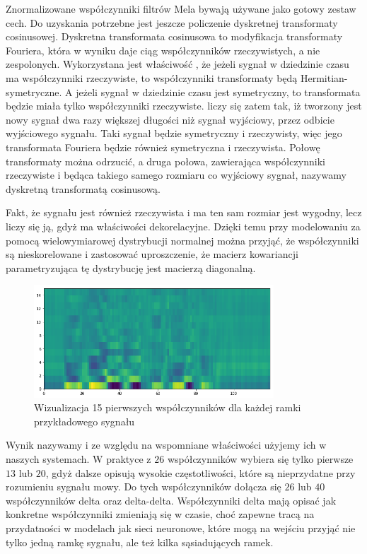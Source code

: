Znormalizowane współczynniki filtrów Mela bywają używane jako gotowy zestaw cech. Do uzyskania 
potrzebne jest jeszcze policzenie dyskretnej transformaty cosinusowej. Dyskretna transformata cosinusowa to modyfikacja
transformaty Fouriera, która w wyniku daje ciąg współczynników rzeczywistych, a nie zespolonych. Wykorzystana jest
właściwość , że jeżeli sygnał w dziedzinie czasu ma współczynniki rzeczywiste, to współczynniki transformaty
będą Hermitian-symetryczne. A jeżeli sygnał w dziedzinie czasu jest symetryczny, to transformata będzie miała
tylko współczynniki rzeczywiste.  liczy się zatem tak, iż tworzony jest nowy sygnał dwa razy większej długości niż
sygnał wyjściowy, przez odbicie wyjściowego sygnału. Taki sygnał będzie symetryczny i rzeczywisty, więc jego transformata
Fouriera będzie również symetryczna i rzeczywista. Połowę transformaty można odrzucić, a druga połowa, zawierająca
współczynniki rzeczywiste i będąca takiego samego rozmiaru co wyjściowy sygnał, nazywamy dyskretną transformatą cosinusową.

Fakt, że  sygnału jest również rzeczywista i ma ten sam rozmiar jest wygodny, lecz liczy się ją,
gdyż ma właściwości dekorelacyjne. Dzięki temu przy modelowaniu  za pomocą wielowymiarowej
dystrybucji normalnej można przyjąć, że
współczynniki są nieskorelowane i zastosować uproszczenie, że macierz kowariancji parametryzująca tę dystrybucję
jest macierzą diagonalną.

\begin{figure}[H]
    \centering
    \includegraphics[width=0.8\textwidth]{images/2_1_e_mfcc}
    \caption{Wizualizacja 15 pierwszych współczynników  dla każdej ramki przykładowego sygnału}
    \label{fig:2_1_e_mfcc}
\end{figure}

Wynik  nazywamy  i ze względu na wspomniane właściwości użyjemy ich
w naszych systemach. W praktyce z $26$ współczynników wybiera się tylko pierwsze $13$ lub $20$, gdyż dalsze opisują
wysokie częstotliwości, które są nieprzydatne przy rozumieniu sygnału mowy. Do tych współczynników dołącza się $26$ lub $40$
współczynników delta oraz delta-delta. Współczynniki delta mają opisać jak konkretne współczynniki zmieniają się w czasie,
choć zapewne tracą na przydatności w modelach jak sieci neuronowe, które mogą na wejściu przyjąć nie tylko jedną ramkę sygnału,
ale też kilka sąsiadujących ramek.

